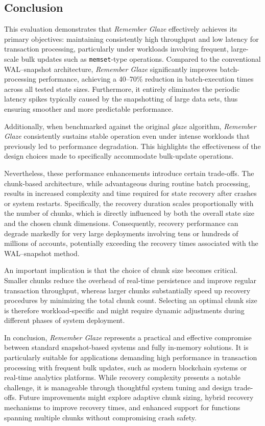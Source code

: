 \documentclass[conference]{IEEEtran}
\begin{document}
\subsection{Conclusion}
This evaluation demonstrates that \textit{Remember Glaze} effectively achieves its primary objectives: maintaining consistently high throughput and low latency for transaction processing, particularly under workloads involving frequent, large-scale bulk updates such as \texttt{memset}-type operations. Compared to the conventional WAL–snapshot architecture, \textit{Remember Glaze} significantly improves batch-processing performance, achieving a 40–70\% reduction in batch-execution times across all tested state sizes. Furthermore, it entirely eliminates the periodic latency spikes typically caused by the snapshotting of large data sets, thus ensuring smoother and more predictable performance.

Additionally, when benchmarked against the original \textit{glaze} algorithm, \textit{Remember Glaze} consistently sustains stable operation even under intense workloads that previously led to performance degradation. This highlights the effectiveness of the design choices made to specifically accommodate bulk-update operations.

Nevertheless, these performance enhancements introduce certain trade-offs. The chunk-based architecture, while advantageous during routine batch processing, results in increased complexity and time required for state recovery after crashes or system restarts. Specifically, the recovery duration scales proportionally with the number of chunks, which is directly influenced by both the overall state size and the chosen chunk dimensions. Consequently, recovery performance can degrade markedly for very large deployments involving tens or hundreds of millions of accounts, potentially exceeding the recovery times associated with the WAL–snapshot method.

An important implication is that the choice of chunk size becomes critical. Smaller chunks reduce the overhead of real-time persistence and improve regular transaction throughput, whereas larger chunks substantially speed up recovery procedures by minimizing the total chunk count. Selecting an optimal chunk size is therefore workload-specific and might require dynamic adjustments during different phases of system deployment.

In conclusion, \textit{Remember Glaze} represents a practical and effective compromise between standard snapshot-based systems and fully in-memory solutions. It is particularly suitable for applications demanding high performance in transaction processing with frequent bulk updates, such as modern blockchain systems or real-time analytics platforms. While recovery complexity presents a notable challenge, it is manageable through thoughtful system tuning and design trade-offs. Future improvements might explore adaptive chunk sizing, hybrid recovery mechanisms to improve recovery times, and enhanced support for functions spanning multiple chunks without compromising crash safety.
\end{document}
